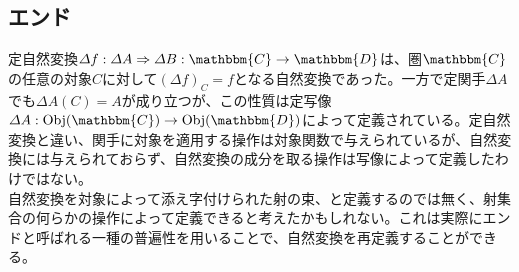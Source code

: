 \documentclass[uplatex,dvipdfmx]{jsarticle}
\newcommand{\cat}[1]{\mathbbm{#1}}
\newcommand{\arrow}{\rightarrow}
\newcommand{\natf}[5]{#1:#2\Rightarrow #3:\cat{#4}\arrow \cat{#5}}
\newcommand{\obj}[1]{\mathrm{Obj}(\cat{#1})}
\newcommand{\mor}[3]{#1:#2\arrow #3}
\numberwithin{proof}{subsection}
\numberwithin{prop}{subsection}
\numberwithin{define}{subsection}
\begin{document}
	\subsection{エンド}
  定自然変換$\natf{\varDelta f}{\varDelta A}{\varDelta B}{C}{D}$は、圏$\cat{C}$の任意の対象$C$に対して$(\varDelta f)_C=f$となる自然変換であった。一方で定関手$\varDelta A$でも$\varDelta A(C)=A$が成り立つが、この性質は定写像$\mor{\varDelta A}{\obj{C}}{\obj{D}}$によって定義されている。定自然変換と違い、関手に対象を適用する操作は対象関数で与えられているが、自然変換には与えられておらず、自然変換の成分を取る操作は写像によって定義したわけではない。\\
  自然変換を対象によって添え字付けられた射の束、と定義するのでは無く、射集合の何らかの操作によって定義できると考えたかもしれない。これは実際にエンドと呼ばれる一種の普遍性を用いることで、自然変換を再定義することができる。\\
\end{document}
